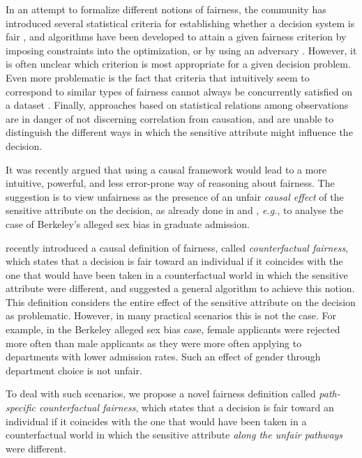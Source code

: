 \documentclass{article}
\newcommand{\eg}{\emph{e.g.}}
\begin{document}
In an attempt to formalize different notions of fairness, the community has introduced several statistical criteria for establishing whether a decision system is fair \cite{dwork12fairness,feldman15certifying,chouldechova17fair,corbett-davies17algorithmic},
and algorithms have been developed to attain a given fairness criterion by imposing constraints into the optimization, or by using an adversary \cite{zafar17fairness,zhang18mitigating}.
However, it is often unclear which criterion is most appropriate for a given decision problem. Even more problematic is the fact that criteria that intuitively seem to correspond to similar types of fairness 
cannot always be concurrently satisfied on a dataset \cite{kleinberg16inherent,berk17fairness,chouldechova17fair}. 
Finally, approaches based on statistical relations among observations are in danger of not discerning correlation from causation, and are unable to distinguish the different ways in which the sensitive 
attribute might influence the decision.

It was recently argued \cite{qureshi16causal,bonchi17exposing,kilbertus17avoiding,kusner17counterfactual,nabi18fair,russell17when,zhang17causal,zhang17anti,zhang18fairness} 
that using a causal framework \cite{pearl00causality,dawid07fundamentals,pearl16causal,peters16elements} would lead to a more intuitive, powerful, and less error-prone way of reasoning about fairness.
The suggestion is to view unfairness as the presence of an unfair \emph{causal effect} of the sensitive attribute on the decision, as already done in \citet{pearl00causality} and \citet{pearl16causal}, \eg, to analyse the case of Berkeley's alleged sex bias in graduate admission.

\citet{kusner17counterfactual} recently introduced a causal definition of fairness, called \emph{counterfactual fairness}, which states that a decision is fair toward an individual 
if it coincides with the one that would have been taken in a counterfactual world in which the sensitive attribute were different, and suggested a general algorithm to achieve this notion.
This definition considers the entire effect of the sensitive attribute on the decision as problematic. However, in many practical scenarios this is not the case.
For example, in the Berkeley alleged sex bias case, female applicants were rejected more often than male applicants as they were more often applying to departments with lower admission rates.
Such an effect of gender through department choice is not unfair.

To deal with such scenarios, we propose a novel fairness definition called \emph{path-specific counterfactual fairness}, which states that
a decision is fair toward an individual if it coincides with the one that would have been taken in a counterfactual world in which the sensitive attribute \emph{along the unfair pathways} were different. 
\end{document}
